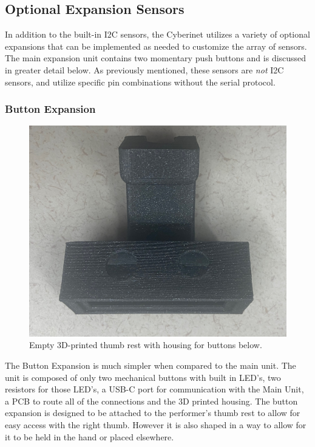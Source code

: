 \subsection{Optional Expansion Sensors}
In addition to the built-in I2C sensors, the Cyberinet utilizes a variety of optional expansions that can be implemented as needed to customize the array of sensors. The main expansion unit contains two momentary push buttons and is discussed in greater detail below. As previously mentioned, these sensors are \emph{not} I2C sensors, and utilize specific pin combinations without the serial protocol.

\subsubsection{Button Expansion}

\begin{center}
    \begin{figure}
        \centering
        \includegraphics[scale=0.1]{diagrams/builtUnits/buttonhousingEmpty.JPG}
        \caption{Empty 3D-printed thumb rest with housing for buttons below.}
        \label{fig:buttonThumbrest}
    \end{figure}
\end{center}


The Button Expansion is much simpler when compared to the main unit. The unit is composed of only two mechanical buttons with built in LED's, two resistors for those LED's, a USB-C port for communication with the Main Unit, a PCB to route all of the connections and the 3D printed housing. The button expansion is designed to be attached to the performer's thumb rest to allow for easy access with the right thumb. However it is also shaped in a way to allow for it to be held in the hand or placed elsewhere.



